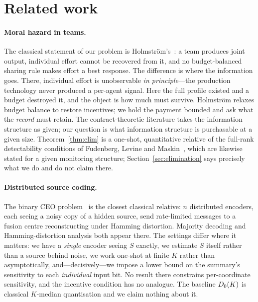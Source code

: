 \section{Related work}
\label{sec:related}

\paragraph{Moral hazard in teams.}
The classical statement of our problem is Holmstr\"om's~\cite{holmstrom1982}: a
team produces joint output, individual effort cannot be recovered from it, and no
budget-balanced sharing rule makes effort a best response. The difference is
where the information goes. There, individual effort is unobservable \emph{in
principle}---the production technology never produced a per-agent signal. Here
the full profile existed and a budget destroyed it, and the object is how much
must survive. Holmstr\"om relaxes budget balance to restore incentives; we hold
the payment bounded and ask what the \emph{record} must retain. The
contract-theoretic literature takes the information structure as given; our
question is what information structure is purchasable at a given size.
Theorem~\ref{thm:elim} is a one-shot, quantitative relative of the full-rank
detectability conditions of Fudenberg, Levine and Maskin~\cite{flm1994}, which
are likewise stated for a given monitoring structure; Section~\ref{sec:elimination}
says precisely what we do and do not claim there.

\paragraph{Distributed source coding.}
The binary CEO problem~\cite{berger1996ceo,binaryceologloss} is the closest
classical relative: $n$ distributed encoders, each seeing a noisy copy of a
hidden source, send rate-limited messages to a fusion centre reconstructing under
Hamming distortion. Majority decoding and Hamming-distortion analysis both appear
there. The settings differ where it matters: we have a \emph{single} encoder
seeing $S$ exactly, we estimate $S$ itself rather than a source behind noise, we
work one-shot at finite $K$ rather than asymptotically, and---decisively---we
impose a lower bound on the summary's sensitivity to each \emph{individual} input
bit. No result there constrains per-coordinate sensitivity, and the incentive
condition has no analogue. The baseline $D_0(K)$ is classical $K$-median
quantisation and we claim nothing about it.

